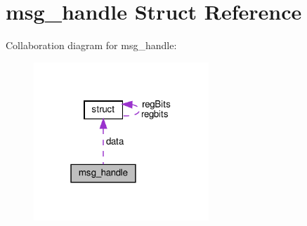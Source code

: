 \hypertarget{structmsg__handle}{}\section{msg\+\_\+handle Struct Reference}
\label{structmsg__handle}


Collaboration diagram for msg\+\_\+handle\+:\nopagebreak
\begin{figure}[H]
\begin{center}
\leavevmode
\includegraphics[width=187pt]{structmsg__handle__coll__graph}
\end{center}
\end{figure}
